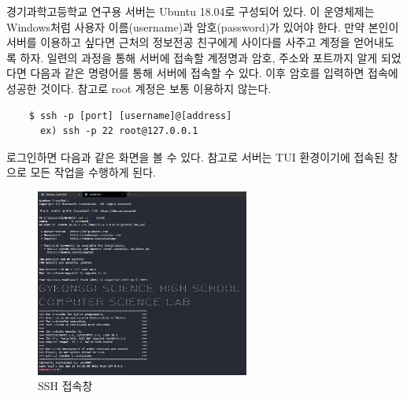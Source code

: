 	경기과학고등학교 연구용 서버는 Ubuntu 18.04로 구성되어 있다. 이 운영체제는 Windows처럼 사용자 이름(username)과 암호(password)가 있어야 한다. 만약 본인이 서버를 이용하고 싶다면 근처의 정보전공 친구에게 사이다를 사주고 계정을 얻어내도록 하자. 일련의 과정을 통해 서버에 접속할 계정명과 암호, 주소와 포트까지 알게 되었다면 다음과 같은 명령어를 통해 서버에 접속할 수 있다. 이후 암호를 입력하면 접속에 성공한 것이다. 참고로 root 계정은 보통 이용하지 않는다.\\
	\begin{lstlisting}
    $ ssh -p [port] [username]@[address]
      ex) ssh -p 22 root@127.0.0.1
    \end{lstlisting}
    
    
   로그인하면 다음과 같은 화면을 볼 수 있다. 참고로 서버는 TUI 환경이기에 접속된 창으로 모든 작업을 수행하게 된다.
    \begin{figure}[H]
	\begin{center}
        \includegraphics[width=7cm]{ssh5.png}
        \caption{SSH 접속창}
    \end{center}
    \end{figure}
	

